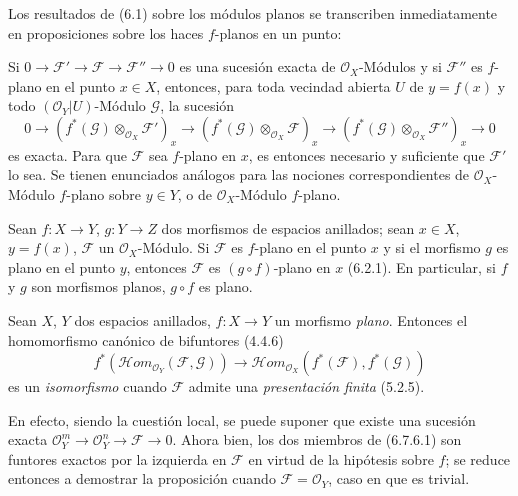 \begin{env}[6.7.4]
\label{0.6.7.4-fr}
Los resultados de (6.1) sobre los módulos planos se transcriben inmediatamente en
proposiciones sobre los haces $f$-planos en un punto:

Si $0\to\mathcal F'\to\mathcal F\to\mathcal F''\to0$ es una sucesión exacta
de $\mathcal O_X$-Módulos y si $\mathcal F''$ es $f$-plano en el punto
$x\in X$, entonces, para toda vecindad abierta $U$ de $y=f(x)$ y todo
$(\mathcal O_Y|U)$-Módulo $\mathcal G$, la sucesión
\[
  0\longrightarrow
  (f^*(\mathcal G)\otimes_{\mathcal O_X}\mathcal F')_x
  \longrightarrow
  (f^*(\mathcal G)\otimes_{\mathcal O_X}\mathcal F)_x
  \longrightarrow
  (f^*(\mathcal G)\otimes_{\mathcal O_X}\mathcal F'')_x
  \longrightarrow0
\]
es exacta. Para que $\mathcal F$ sea $f$-plano en $x$, es entonces necesario y suficiente
que $\mathcal F'$ lo sea. Se tienen enunciados análogos para las nociones
correspondientes de $\mathcal O_X$-Módulo $f$-plano sobre $y\in Y$, o
de $\mathcal O_X$-Módulo $f$-plano.
\end{env}

\begin{env}[6.7.5]
\label{0.6.7.5-fr}
Sean $f:X\to Y$, $g:Y\to Z$ dos morfismos de espacios anillados; sean
$x\in X$, $y=f(x)$, $\mathcal F$ un $\mathcal O_X$-Módulo. Si $\mathcal F$
es $f$-plano en el punto $x$ y si el morfismo $g$ es plano en el punto $y$, entonces
$\mathcal F$ es $(g\circ f)$-plano en $x$ (6.2.1). En particular, si $f$ y
$g$ son morfismos planos, $g\circ f$ es plano.
\end{env}

\begin{env}[6.7.6]
\label{0.6.7.6-fr}
Sean $X$, $Y$ dos espacios anillados, $f:X\to Y$ un morfismo \emph{plano}. Entonces
el homomorfismo canónico de bifuntores (4.4.6)
\[
  f^*(\mathcal{H}om_{\mathcal O_Y}(\mathcal F,\mathcal G))
  \longrightarrow
  \mathcal{H}om_{\mathcal O_X}(f^*(\mathcal F),f^*(\mathcal G))
  \tag{6.7.6.1}
  \label{0.6.7.6.1-fr}
\]
es un \emph{isomorfismo} cuando $\mathcal F$ admite una \emph{presentación finita}
(5.2.5).

En efecto, siendo la cuestión local, se puede suponer que existe una sucesión
exacta $\mathcal O_Y^m\to\mathcal O_Y^n\to\mathcal F\to0$. Ahora bien, los dos
miembros de (6.7.6.1) son funtores exactos por la izquierda en $\mathcal F$ en
virtud de la hipótesis sobre $f$; se reduce entonces a demostrar la proposición
cuando $\mathcal F=\mathcal O_Y$, caso en que es trivial.
\end{env}

